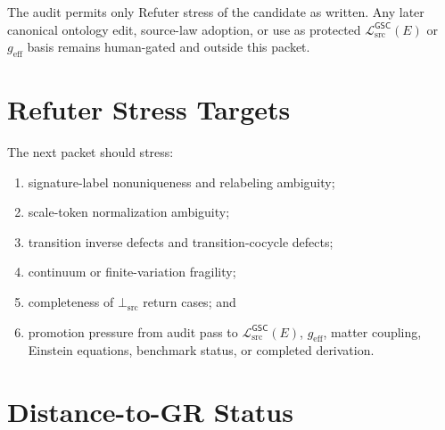 \documentclass[11pt]{article}
\newcommand{\MetricData}{\mathcal{L}_{\mathrm{src}}^{\mathsf{GSC}}}
\newcommand{\geff}{g_{\mathrm{eff}}}
\newcommand{\BottomSrc}{\bot_{\mathrm{src}}}
\begin{document}
The audit permits only Refuter stress of the candidate as written. Any later
canonical ontology edit, source-law adoption, or use as protected
\(\MetricData(E)\) or \(\geff\) basis remains human-gated and outside this
packet.

\section{Refuter Stress Targets}

The next packet should stress:
\begin{enumerate}[leftmargin=*]
  \item signature-label nonuniqueness and relabeling ambiguity;
  \item scale-token normalization ambiguity;
  \item transition inverse defects and transition-cocycle defects;
  \item continuum or finite-variation fragility;
  \item completeness of \(\BottomSrc\) return cases; and
  \item promotion pressure from audit pass to \(\MetricData(E)\), \(\geff\),
  matter coupling, Einstein equations, benchmark status, or completed
  derivation.
\end{enumerate}

\section{Distance-to-GR Status}
\end{document}
